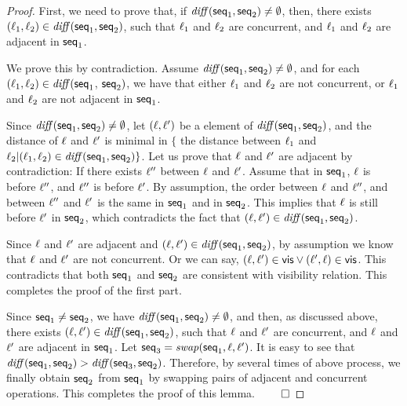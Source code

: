 \begin {proof}

First, we need to prove that, if $\mathit{diff}(\mathsf{seq}_1,\mathsf{seq}_2) \neq \emptyset$, then, there exists $(\ell_1,\ell_2) \in \mathit{diff}(\mathsf{seq}_1,\mathsf{seq}_2)$, such that $\ell_1$ and $\ell_2$ are concurrent, and $\ell_1$ and $\ell_2$ are adjacent in $\mathsf{seq}_1$.

We prove this by contradiction. Assume $\mathit{diff}(\mathsf{seq}_1,\mathsf{seq}_2) \neq \emptyset$, and for each $(\ell_1,\ell_2) \in \mathit{diff}(\mathsf{seq}_1$, $\mathsf{seq}_2)$, we have that either $\ell_1$ and $\ell_2$ are not concurrent, or $\ell_1$ and $\ell_2$ are not adjacent in $\mathsf{seq}_1$.

Since $\mathit{diff}(\mathsf{seq}_1,\mathsf{seq}_2) \neq \emptyset$, let $(\ell,\ell')$ be a element of $\mathit{diff}(\mathsf{seq}_1,\mathsf{seq}_2)$, and the distance of $\ell$ and $\ell'$ is minimal in $\{$ the distance between $\ell_1$ and $\ell_2 \vert (\ell_1,\ell_2) \in \mathit{diff}(\mathsf{seq}_1,\mathsf{seq}_2) \}$. Let us prove that $\ell$ and $\ell'$ are adjacent by contradiction: If there exists $\ell''$ between $\ell$ and $\ell'$. Assume that in $\mathsf{seq}_1$, $\ell$ is before $\ell''$, and $\ell''$ is before $\ell'$. By assumption, the order between $\ell$ and $\ell''$, and between $\ell''$ and $\ell'$ is the same in $\mathsf{seq}_1$ and in $\mathsf{seq}_2$. This implies that $\ell$ is still before $\ell'$ in $\mathsf{seq}_2$, which contradicts the fact that $(\ell,\ell') \in \mathit{diff}(\mathsf{seq}_1,\mathsf{seq}_2)$.

Since $\ell$ and $\ell'$ are adjacent and $(\ell,\ell') \in \mathit{diff}(\mathsf{seq}_1,\mathsf{seq}_2)$, by assumption we know that $\ell$ and $\ell'$ are not concurrent. Or we can say, $(\ell,\ell') \in \mathsf{vis} \vee (\ell',\ell) \in \mathsf{vis}$. This contradicts that both $\mathsf{seq}_1$ and $\mathsf{seq}_2$ are consistent with visibility relation. This completes the proof of the first part.

Since $\mathsf{seq}_1 \neq \mathsf{seq}_2$, we have $\mathit{diff}(\mathsf{seq}_1,\mathsf{seq}_2) \neq \emptyset$, and then, as discussed above, there exists $(\ell,\ell') \in \mathit{diff}(\mathsf{seq}_1,\mathsf{seq}_2)$, such that $\ell$ and $\ell'$ are concurrent, and $\ell$ and $\ell'$ are adjacent in $\mathsf{seq}_1$. Let $\mathsf{seq}_3 = \mathit{swap}(\mathsf{seq}_1,\ell,\ell')$. It is easy to see that $\mathit{diff}(\mathsf{seq}_1,\mathsf{seq}_2) > \mathit{diff}(\mathsf{seq}_3,\mathsf{seq}_2)$. Therefore, by several times of above process, we finally obtain $\mathsf{seq}_2$ from $\mathsf{seq}_1$ by swapping pairs of adjacent and concurrent operations. This completes the proof of this lemma. $\qed$
\end {proof}






